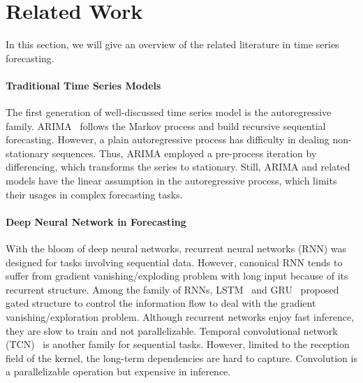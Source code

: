 \documentclass{article}
\begin{document}
\newpage
\appendix

\section{Related Work}
\label{App:related_works}
In this section, we will give an overview of the related literature in time series forecasting. 






\paragraph{Traditional Time Series Models} The first generation of well-discussed time series model is the autoregressive family. ARIMA~\cite{box_arima2,box_distribution_1970} follows the Markov process and build recursive sequential forecasting. However, a plain autoregressive process has difficulty in dealing non-stationary sequences. Thus, ARIMA employed a pre-process iteration by differencing, which transforms the series to stationary. Still, ARIMA and related models have the linear assumption in the autoregressive process, which limits their usages in complex forecasting tasks. 

\paragraph{Deep Neural Network in Forecasting}
With the bloom of deep neural networks, recurrent neural networks (RNN) was designed for tasks involving sequential data. However, canonical RNN tends to suffer from gradient vanishing/exploding problem with long input because of its recurrent structure. Among the family of RNNs, LSTM~\cite{hochreiter_long_1997_lstm} and GRU~\cite{GRU_cho_et_al_2014} proposed gated structure to control the information flow to deal with the gradient vanishing/exploration problem. Although recurrent networks enjoy fast inference, they are slow to train and not parallelizable. Temporal convolutional network (TCN)~\cite{Think_globally_act_locally_tcn_time_series_2019} is another family for sequential tasks. However, limited to the reception field of the kernel, the long-term dependencies are hard to capture. Convolution is a parallelizable operation but expensive in inference.
\end{document}
